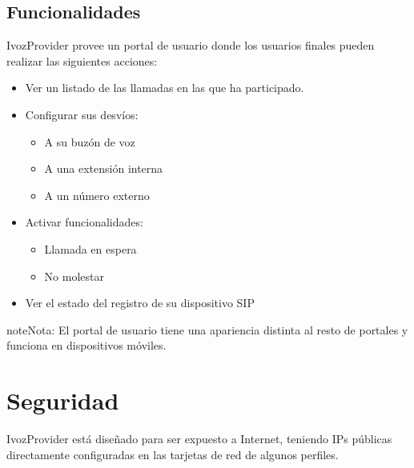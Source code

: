 \documentclass[letterpaper,10pt,spanish]{sphinxmanual}
\begin{document}
\section{Funcionalidades}
\label{user_portal/features::doc}\label{user_portal/features:features}
IvozProvider provee un portal de usuario donde los usuarios finales pueden realizar las siguientes acciones:
\begin{itemize}
\item {} 
Ver un listado de las llamadas en las que ha participado.

\item {} 
Configurar sus desvíos:
\begin{itemize}
\item {} 
A su buzón de voz

\item {} 
A una extensión interna

\item {} 
A un número externo

\end{itemize}

\item {} 
Activar funcionalidades:
\begin{itemize}
\item {} 
Llamada en espera

\item {} 
No molestar

\end{itemize}

\item {} 
Ver el estado del registro de su dispositivo SIP

\end{itemize}

\begin{notice}{note}{Nota:}
El portal de usuario tiene una apariencia distinta al resto de portales y funciona en dispositivos móviles.
\end{notice}


\chapter{Seguridad}
\label{security_and_maintenance/security/index:security}\label{security_and_maintenance/security/index::doc}\label{security_and_maintenance/security/index:id1}
IvozProvider está diseñado para ser expuesto a Internet, teniendo IPs públicas directamente configuradas en las tarjetas de red de algunos perfiles.
\end{document}
